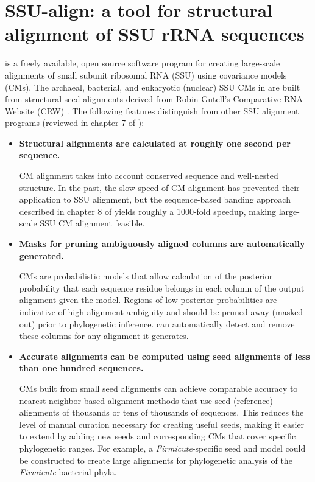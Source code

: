 \chapter{SSU-align: a tool for structural alignment of SSU
  rRNA sequences}
\label{chap:ssualign}

 is a freely available, open source software program
for creating large-scale alignments of small subunit ribosomal RNA
(SSU) using covariance models (CMs). The archaeal, bacterial,
and eukaryotic (nuclear) 
SSU CMs in  are built from structural seed alignments derived from
Robin Gutell's Comparative RNA Website (CRW) \cite{CannoneGutell02}.
The following features distinguish  from other
SSU alignment programs (reviewed in chapter 7 of \cite{Nawrocki09b}):

\begin{itemize}

\item \textbf{Structural alignments are calculated at roughly one
  second per sequence.}  

  CM alignment takes into account conserved sequence and well-nested
  structure. In the past, the slow speed of CM alignment has prevented
  their application to SSU alignment, but the sequence-based banding
  approach described in chapter 8 of \cite{Nawrocki09b} yields roughly a 1000-fold speedup,
  making large-scale SSU CM alignment feasible.

\item \textbf{Masks for pruning ambiguously aligned columns are
  automatically generated.}
  
  CMs are probabilistic models that allow calculation of the posterior
  probability that each sequence residue belongs in each column of the
  output alignment given the model. Regions of low posterior
  probabilities are indicative of high alignment ambiguity and
  should be pruned away (masked out) prior to phylogenetic
  inference.  can automatically detect and remove
  these columns for any alignment it generates.

\item \textbf{Accurate alignments can be computed using seed
  alignments of less than one hundred sequences.}

  CMs built from small seed alignments %
  can achieve comparable accuracy to nearest-neighbor based alignment
  methods that use seed (reference) alignments of thousands or tens of
  thousands of sequences. This reduces the level of manual curation
  necessary for creating useful seeds, making it easier to extend
   by adding new seeds and corresponding CMs that cover
  specific phylogenetic ranges. For example, a
  \emph{Firmicute}-specific seed and model could be constructed to
  create large alignments for phylogenetic analysis of the \emph{Firmicute}
  bacterial phyla.

\end{itemize}

